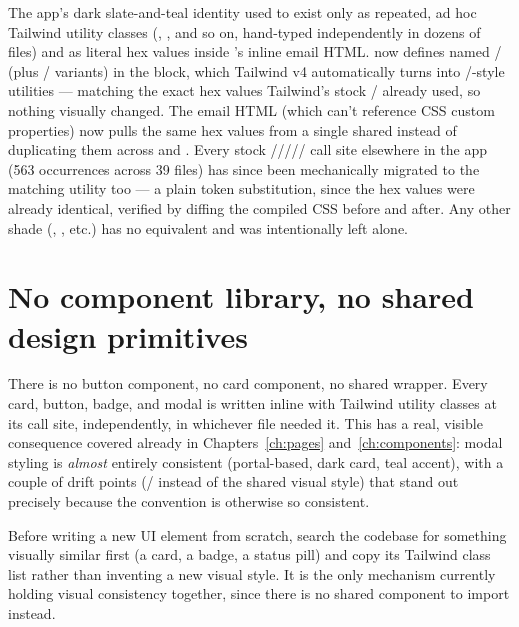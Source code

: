 \begin{olknote}
The app's dark slate-and-teal identity used to exist only as repeated, ad hoc Tailwind utility classes (, , and so on, hand-typed independently in dozens of files) and as literal hex values inside 's inline email HTML.  now defines named / (plus / variants) in the  block, which Tailwind v4 automatically turns into /-style utilities — matching the exact hex values Tailwind's stock / already used, so nothing visually changed. The email HTML (which can't reference CSS custom properties) now pulls the same hex values from a single shared  instead of duplicating them across  and . Every stock ///// call site elsewhere in the app (563 occurrences across 39 files) has since been mechanically migrated to the matching  utility too — a plain token substitution, since the hex values were already identical, verified by diffing the compiled CSS before and after. Any other shade (, , etc.) has no  equivalent and was intentionally left alone.
\end{olknote}

\section{No component library, no shared design primitives}

There is no button component, no card component, no shared  wrapper. Every card, button, badge, and modal is written inline with Tailwind utility classes at its call site, independently, in whichever file needed it. This has a real, visible consequence covered already in Chapters~\ref{ch:pages} and~\ref{ch:components}: modal styling is \emph{almost} entirely consistent (portal-based, dark card, teal accent), with a couple of drift points (/ instead of the shared visual style) that stand out precisely because the convention is otherwise so consistent.

\begin{olktip}
Before writing a new UI element from scratch, search the codebase for something visually similar first (a card, a badge, a status pill) and copy its Tailwind class list rather than inventing a new visual style. It is the only mechanism currently holding visual consistency together, since there is no shared component to import instead.
\end{olktip}

